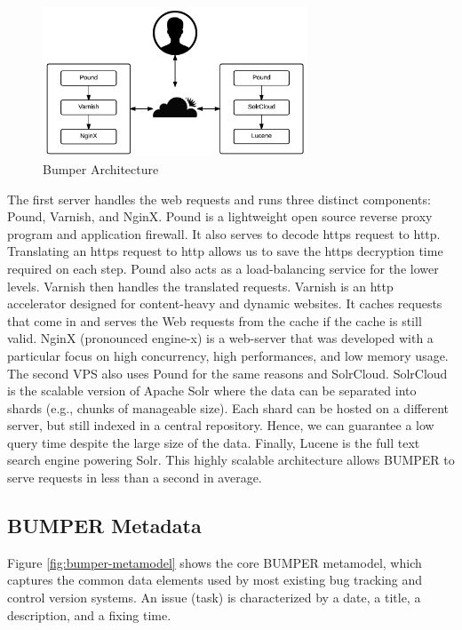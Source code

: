 \documentclass[12pt]{report}
\begin{document}
\begin{figure}
  \centering
  \includegraphics[width=0.7\textwidth]{media/archi.png}
  \caption{Bumper Architecture\label{fig:bumper-architecture}}
\end{figure}

The first server handles the web requests and runs three distinct
components: Pound, Varnish, and NginX. Pound is a lightweight open
source reverse proxy program and application firewall. It also serves to
decode https request to http. Translating an https request to http
allows us to save the https decryption time required on each step. Pound
also acts as a load-balancing service for the lower levels. Varnish then
handles the translated requests. Varnish is an http accelerator designed
for content-heavy and dynamic websites. It caches requests that come in
and serves the Web requests from the cache if the cache is still valid.
NginX (pronounced engine-x) is a web-server that was developed with a
particular focus on high concurrency, high performances, and low memory
usage. The second VPS also uses Pound for the same reasons and
SolrCloud. SolrCloud is the scalable version of Apache Solr where the
data can be separated into shards (e.g., chunks of manageable size).
Each shard can be hosted on a different server, but still indexed in a
central repository. Hence, we can guarantee a low query time despite the
large size of the data. Finally, Lucene is the full text search engine
powering Solr. This highly scalable architecture allows BUMPER to serve
requests in less than a second in average.

\subsection{\texorpdfstring{BUMPER
Metadata\label{sub:BUMPER Metadata}}{BUMPER Metadata}}\label{bumper-metadata}

Figure \ref{fig:bumper-metamodel} shows the core BUMPER metamodel, which
captures the common data elements used by most existing bug tracking and
control version systems. An issue (task) is characterized by a date, a
title, a description, and a fixing time.
\end{document}
